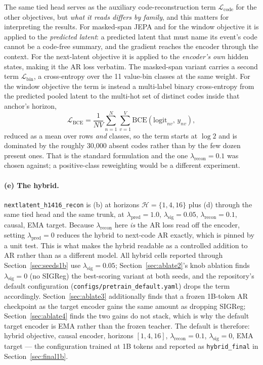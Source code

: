 \documentclass[11pt,a4paper]{article}
\newcommand{\code}[1]{\texttt{\small #1}}
\begin{document}
The same tied head serves as the auxiliary code-reconstruction term
$\mathcal{L}_{\mathrm{code}}$ for the other objectives, but \emph{what it reads
differs by family}, and this matters for interpreting the results. For
masked-span JEPA and for the window objective it is applied to the
\emph{predicted latent}: a predicted latent that must name its event's code
cannot be a code-free summary, and the gradient reaches the encoder through the
context. For the next-latent objective it is applied to the \emph{encoder's own}
hidden states, making it the AR loss verbatim. The masked-span variant carries a
second term $\mathcal{L}_{\mathrm{bin}}$, a cross-entropy over the 11 value-bin
classes at the same weight. For the window objective the term is instead a
multi-label binary cross-entropy from the predicted pooled latent to the
multi-hot set of distinct codes inside that anchor's horizon,
\begin{equation}
\mathcal{L}_{\mathrm{BCE}}
= \frac{1}{NV}\sum_{n=1}^{N}\sum_{v=1}^{V}
  \mathrm{BCE}\!\left(\mathrm{logit}_{nv},\, y_{nv}\right),
\end{equation}
reduced as a mean over rows \emph{and} classes, so the term starts at $\log 2$
and is dominated by the roughly 30{,}000 absent codes rather than by the few
dozen present ones. That is the standard formulation and the one
$\lambda_{\mathrm{recon}} = 0.1$ was chosen against; a positive-class reweighting
would be a different experiment.

\paragraph{(e) The hybrid.}
\code{nextlatent\_h1416\_recon} is (b) at horizons $\mathcal{H} = \{1, 4, 16\}$
plus (d) through the same tied head and the same trunk, at
$\lambda_{\mathrm{pred}} = 1.0$, $\lambda_{\mathrm{sig}} = 0.05$,
$\lambda_{\mathrm{recon}} = 0.1$, causal, EMA target. Because
$\lambda_{\mathrm{recon}}$ here \emph{is} the AR loss read off the encoder,
setting $\lambda_{\mathrm{pred}} = 0$ reduces the hybrid to next-code AR
exactly, which is pinned by a unit test. This is what makes the hybrid readable
as a controlled addition to AR rather than as a different model. All hybrid
cells reported through Section~\ref{sec:seeds1b} use $\lambda_{\mathrm{sig}} =
0.05$; Section~\ref{sec:ablate2}'s knob ablation finds $\lambda_{\mathrm{sig}}
= 0$ (no SIGReg) the best-scoring variant at both seeds, and the repository's
default configuration (\code{configs/pretrain\_default.yaml}) drops the term
accordingly. Section~\ref{sec:ablate3} additionally finds that a frozen 1B-token
AR checkpoint as the target encoder gains the same amount as dropping SIGReg;
Section~\ref{sec:ablate4} finds the two gains do not stack, which is why the
default target encoder is EMA rather than the frozen teacher. The default is
therefore: hybrid objective, causal encoder, horizons $[1,4,16]$,
$\lambda_{\mathrm{recon}} = 0.1$, $\lambda_{\mathrm{sig}} = 0$, EMA target ---
the configuration trained at 1B tokens and reported as \code{hybrid\_final}
in Section~\ref{sec:final1b}.
\end{document}
